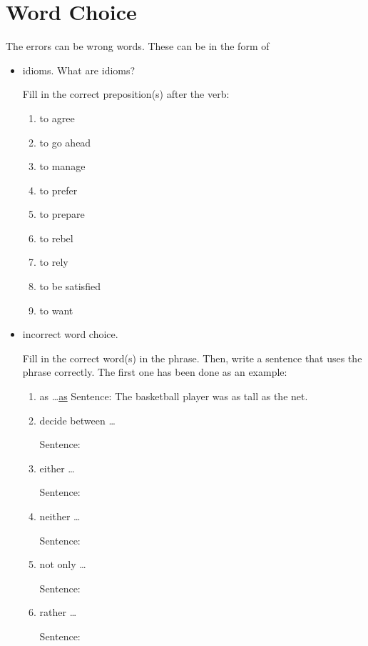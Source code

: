 \section{Word Choice}
The errors can be wrong words. These can be in the form of

\begin{itemize}
\item{idioms. What are idioms?} \hrulefill

Fill in the correct preposition(s) after the verb:

\begin{spacing}{1.5}
\begin{enumerate}
\item to agree \hrulefill
\item to go ahead \hrulefill
\item to manage \hrulefill
\item to prefer \hrulefill
\item to prepare \hrulefill
\item to rebel \hrulefill
\item to rely \hrulefill
\item to be satisfied \hrulefill
\item to want \hrulefill
\end{enumerate}
\end{spacing}

\vfill
{}

\vfill\item{incorrect word choice.} 

Fill in the correct word(s) in the phrase. Then, write a sentence that uses the phrase correctly. The first one has been done as an example:

\begin{spacing}{1.5}
\begin{enumerate}
\item as \ldots \ul{as}
Sentence: The basketball player was as tall as the net.

\item decide between \ldots \shortline

Sentence: \hrulefill

\item either \dots \shortline

Sentence: \hrulefill

\item neither \ldots \shortline
 
Sentence: \hrulefill

\item not only \ldots \shortline

Sentence: \hrulefill

\item rather \ldots \shortline

Sentence: \hrulefill
\end{enumerate}
\end{spacing}
\end{itemize}

